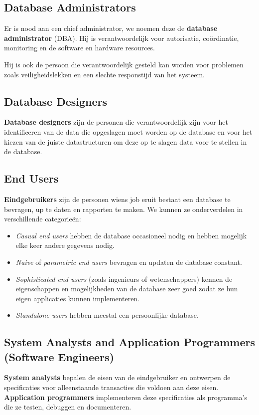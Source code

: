 \subsection{Database Administrators}
Er is nood aan een chief administrator, we noemen deze de \textbf{database administrator} (DBA). Hij is verantwoordelijk voor autorisatie, co\"ordinatie, monitoring en de software en hardware resources.

Hij is ook de persoon die verantwoordelijk gesteld kan worden voor problemen zoals veiligheidslekken en een slechte responstijd van het systeem.

\subsection{Database Designers}
\textbf{Database designers} zijn de personen die verantwoordelijk zijn voor het identificeren van de data die opgeslagen moet worden op de database en voor het kiezen van de juiste datastructuren om deze op te slagen data voor te stellen in de database.

\subsection{End Users}
\textbf{Eindgebruikers} zijn de personen wiens job eruit bestaat een database te bevragen, up te daten en rapporten te maken. We kunnen ze onderverdelen in verschillende categorie\"en:
\begin{itemize}
\item \textit{Casual end users} hebben de database occasioneel nodig en hebben mogelijk elke keer andere gegevens nodig.
\item \textit{Naive} of \textit{parametric end users} bevragen en updaten de database constant.
\item \textit{Sophisticated end users} (zoals ingenieurs of wetenschappers) kennen de eigenschappen en mogelijkheden van de database zeer goed zodat ze hun eigen applicaties kunnen implementeren.
\item \textit{Standalone users} hebben meestal een persoonlijke database.
\end{itemize}

\subsection{System Analysts and Application Programmers (Software Engineers)}
\textbf{System analysts} bepalen de eisen van de eindgebruiker en ontwerpen de specificaties voor alleenstaande transacties die voldoen aan deze eisen. \textbf{Application programmers} implementeren deze specificaties als programma's die ze testen, debuggen en documenteren.



